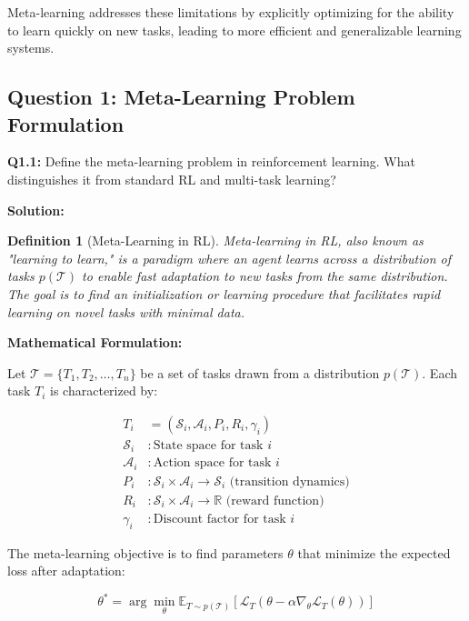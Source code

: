 \documentclass[12pt]{article}
\newcommand{\ieee}[1]{\textcolor{IEEEBlue}{\textbf{#1}}}
\newtheorem{definition}{Definition}
\begin{document}
{{			Meta-learning addresses these limitations by explicitly optimizing for the ability to learn quickly on new tasks, leading to more efficient and generalizable learning systems.
			
			\subsection{Question 1: Meta-Learning Problem Formulation}
			
			\textbf{Q1.1:} Define the meta-learning problem in reinforcement learning. What distinguishes it from standard RL and multi-task learning?
			
			\textbf{Solution:}
			
			\begin{definition}[Meta-Learning in RL]
			Meta-learning in RL, also known as "learning to learn," is a paradigm where an agent learns across a distribution of tasks $p(\mathcal{T})$ to enable fast adaptation to new tasks from the same distribution. The goal is to find an initialization or learning procedure that facilitates rapid learning on novel tasks with minimal data.
			\end{definition}
			
			\ieee{Mathematical Formulation:}
			
			Let $\mathcal{T} = \{T_1, T_2, \ldots, T_n\}$ be a set of tasks drawn from a distribution $p(\mathcal{T})$. Each task $T_i$ is characterized by:
			
			\begin{align}
			T_i &= (\mathcal{S}_i, \mathcal{A}_i, P_i, R_i, \gamma_i) \\
			\mathcal{S}_i &: \text{State space for task } i \\
			\mathcal{A}_i &: \text{Action space for task } i \\
			P_i &: \mathcal{S}_i \times \mathcal{A}_i \rightarrow \mathcal{S}_i \text{ (transition dynamics)} \\
			R_i &: \mathcal{S}_i \times \mathcal{A}_i \rightarrow \mathbb{R} \text{ (reward function)} \\
			\gamma_i &: \text{Discount factor for task } i
			\end{align}
			
			The meta-learning objective is to find parameters $\theta$ that minimize the expected loss after adaptation:
			
			\begin{equation}
			\theta^* = \arg\min_\theta \mathbb{E}_{T \sim p(\mathcal{T})} \left[ \mathcal{L}_T(\theta - \alpha \nabla_\theta \mathcal{L}_T(\theta)) \right]
			\end{equation}
			
}}
\end{document}

